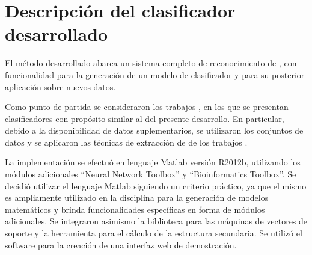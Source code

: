 %
%
%
%
\setcounter{chapter}{2}
%
\chapter{Descripción del clasificador desarrollado}
%
El método desarrollado abarca un sistema completo de reconocimiento de
, con funcionalidad para la generación de un modelo de
clasificador y para su posterior aplicación sobre nuevos datos.

Como punto de partida se consideraron los trabajos
\cite{xue,ng,batuwita,sheng,sewer,ding}, en los que se presentan
clasificadores con propósito similar al del presente desarrollo.
En particular, debido a la disponibilidad de datos suplementarios, se
utilizaron los conjuntos de datos y se aplicaron las técnicas de
extracción de  de los trabajos \cite{xue,ng,batuwita}.

La implementación se efectuó en lenguaje Matlab versión R2012b,
utilizando los módulos adicionales ``Neural Network Toolbox''
y ``Bioinformatics Toolbox''.
Se decidió utilizar el lenguaje Matlab siguiendo un criterio práctico,
ya que el mismo es ampliamente utilizado en la disciplina para la
generación de modelos matemáticos y brinda funcionalidades específicas
en forma de módulos adicionales.
Se integraron asimismo la biblioteca  \cite{libsvm} para
las máquinas de vectores de soporte y la herramienta 
\cite{vienna} para el cálculo de la estructura secundaria.
Se utilizó el software \work\webdemo{} \cite{webdemobuilder} para
la creación de una interfaz web de demostración.
